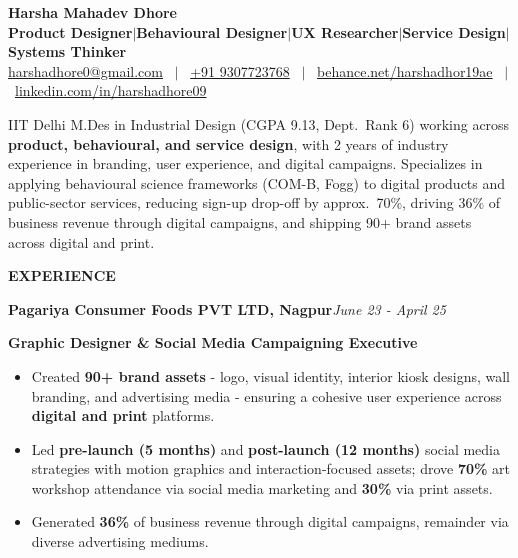 \documentclass[10pt,a4paper]{article}
\makeatletter
\newcommand{\myEmail}{harshadhore0@gmail.com}
\newcommand{\myPhone}{+91 9307723768}
\newcommand{\myPortfolio}{https://www.behance.net/harshadhor19ae}
\newcommand{\myLinkedin}{https://www.linkedin.com/in/harshadhore09}
\newcommand{\cvsec}[1]{%
  \vspace{6pt}%
  {\color{accent}\large\bfseries\MakeUppercase{#1}}\par
  \vspace{1.5pt}{\color{ink}\hrule height 0.6pt}\vspace{4pt}\par
}
\newcommand{\entry}[2]{{\bfseries #1}\hfill{\itshape #2}\par\vspace{1.5pt}}
\makeatother
\begin{document}
\begin{center}
{\Huge\bfseries Harsha Mahadev Dhore}\\[7pt]
{\fontsize{13.5}{15.5}\selectfont\bfseries\color{accent} Product Designer\hspace{2pt}$|$\hspace{2pt}Behavioural Designer\hspace{2pt}$|$\hspace{2pt}UX Researcher\hspace{2pt}$|$\hspace{2pt}Service Design\hspace{2pt}$|$\hspace{2pt}Systems Thinker}\\[5pt]
{\small \href{mailto:\myEmail}{\textcolor{accent}{\myEmail}} \ $|$ \ \href{tel:+919307723768}{\myPhone} \ $|$ \ \href{\myPortfolio}{\textcolor{accent}{behance.net/harshadhor19ae}} \ $|$ \ \href{\myLinkedin}{\textcolor{accent}{linkedin.com/in/harshadhore09}}}
\end{center}
\vspace{-8pt}

IIT Delhi M.Des in Industrial Design (CGPA 9.13, Dept.\ Rank 6) working across \textbf{product, behavioural, and service design}, with 2 years of industry experience in branding, user experience, and digital campaigns. Specializes in applying behavioural science frameworks (COM-B, Fogg) to digital products and public-sector services, reducing sign-up drop-off by approx.\ 70\%, driving 36\% of business revenue through digital campaigns, and shipping 90+ brand assets across digital and print.

\cvsec{Experience}

\entry{Pagariya Consumer Foods PVT LTD, Nagpur}{June 23 - April 25}
{\bfseries Graphic Designer \& Social Media Campaigning Executive}\par\vspace{1.5pt}
\begin{itemize}
  \item Created \textbf{90+ brand assets} - logo, visual identity, interior kiosk designs, wall branding, and advertising media - ensuring a cohesive user experience across \textbf{digital and print} platforms.
  \item Led \textbf{pre-launch (5 months)} and \textbf{post-launch (12 months)} social media strategies with motion graphics and interaction-focused assets; drove \textbf{70\%} art workshop attendance via social media marketing and \textbf{30\%} via print assets.
  \item Generated \textbf{36\%} of business revenue through digital campaigns, remainder via diverse advertising mediums.
\end{itemize}
\vspace{4pt}
\end{document}
